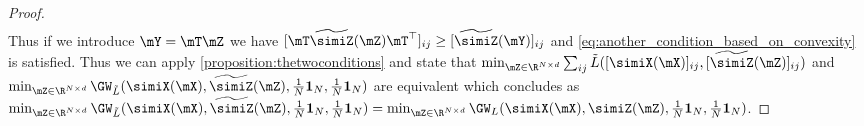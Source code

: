 \begin{proof}
\begin{equation}
\begin{split}
		\end{split}
	\end{equation}
	Thus if we introduce $\mY = \mT \mZ$ we have $[\mT \widetilde{\simiZ}(\mZ) \mT^\top]_{ij} \geq [\widetilde{\simiZ}(\mY)]_{ij}$ and \cref{eq:another_condition_based_on_convexity} is satisfied. Thus we can apply \cref{proposition:thetwoconditions} and state that $\min_{\mZ \in \R^{N \times d}} \sum_{ij} \tilde{L}([\simiX(\mX)]_{ij}, [\widetilde{\simiZ}(\mZ)]_{ij})$ and $\min_{\mZ \in \R^{N \times d}} \GW_{\tilde{L}}(\simiX(\mX), \widetilde{\simiZ}(\mZ), \frac{1}{N}\mathbf{1}_N, \frac{1}{N}\mathbf{1}_N)$ are equivalent which concludes as $\min_{\mZ \in \R^{N \times d}} \GW_{\tilde{L}}(\simiX(\mX), \widetilde{\simiZ}(\mZ), \frac{1}{N}\mathbf{1}_N, \frac{1}{N}\mathbf{1}_N) = \min_{\mZ \in \R^{N \times d}} \GW_{L}(\simiX(\mX), \simiZ(\mZ), \frac{1}{N}\mathbf{1}_N, \frac{1}{N}\mathbf{1}_N)$.
\end{proof}


